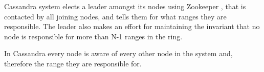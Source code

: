 Cassandra system elects a leader amongst its nodes using Zookeeper \cite{Junqueira2007}, that is contacted by all joining nodes, and tells them for what ranges they are responsible. The leader also makes an effort for maintaining the invariant that no node is responsible for more than N-1 ranges in the ring. 

In Cassandra every node is aware of every other node in the system and, therefore the range they are responsible for.
